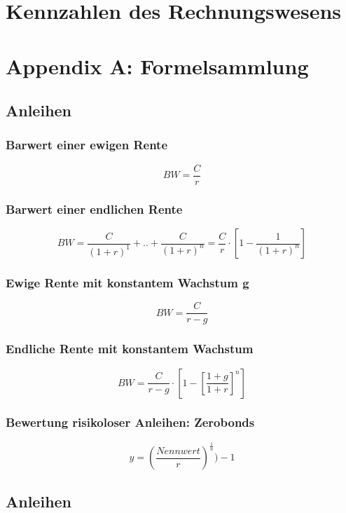 \section{Kennzahlen des Rechnungswesens}



\section{Appendix A: Formelsammlung}

\subsection{Anleihen}

\subsubsection{Barwert einer ewigen Rente}

\[BW = \frac{C}{r}\]

\subsubsection{Barwert einer endlichen Rente}

\[BW = \frac{C}{(1+r)^1}+..+\frac{C}{(1+r)^n} = \frac{C}{r}\cdot[1-\frac{1}{(1+r)^n}]\]

\subsubsection{Ewige Rente mit konstantem Wachstum g}

\[BW = \frac{C}{r-g}\]

\subsubsection{Endliche Rente mit konstantem Wachstum}

\[BW = \frac{C}{r-g} \cdot [1-[\frac{1+g}{1+r}]^n]\]

\subsubsection{Bewertung risikoloser Anleihen: Zerobonds}

\[y = (\frac{Nennwert}{r})^{\frac{1}{n}})-1\]


\subsection{Anleihen}

